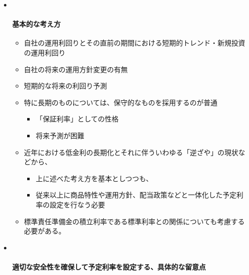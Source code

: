 \documentclass[]{article}
\begin{document}
\begin{itemize}
\item ~
  \hypertarget{ux57faux672cux7684ux306aux8003ux3048ux65b9-1}{%
  \paragraph{基本的な考え方}\label{ux57faux672cux7684ux306aux8003ux3048ux65b9-1}}

  \begin{itemize}
  \tightlist
  \item
    自社の運用利回りとその直前の期間における短期的トレンド・新規投資の運用利回り
  \item
    自社の将来の運用方針変更の有無
  \item
    短期的な将来の利回り予測
  \item
    特に長期のものについては、保守的なものを採用するのが普通

    \begin{itemize}
    \tightlist
    \item
      「保証利率」としての性格
    \item
      将来予測が困難
    \end{itemize}
  \item
    近年における低金利の長期化とそれに伴ういわゆる「逆ざや」の現状などから、

    \begin{itemize}
    \tightlist
    \item
      上に述べた考え方を基本としつつも、
    \item
      従来以上に商品特性や運用方針、配当政策などと一体化した予定利率の設定を行なう必要
    \end{itemize}
  \item
    標準責任準備金の積立利率である標準利率との関係についても考慮する必要がある。
  \end{itemize}
\item ~
  \hypertarget{ux9069ux5207ux306aux5b89ux5168ux6027ux3092ux78baux4fddux3057ux3066ux4e88ux5b9aux5229ux7387ux3092ux8a2dux5b9aux3059ux308bux5177ux4f53ux7684ux306aux7559ux610fux70b9}{%
  \paragraph{適切な安全性を確保して予定利率を設定する、具体的な留意点}\label{ux9069ux5207ux306aux5b89ux5168ux6027ux3092ux78baux4fddux3057ux3066ux4e88ux5b9aux5229ux7387ux3092ux8a2dux5b9aux3059ux308bux5177ux4f53ux7684ux306aux7559ux610fux70b9}}


\end{itemize}
\end{document}
